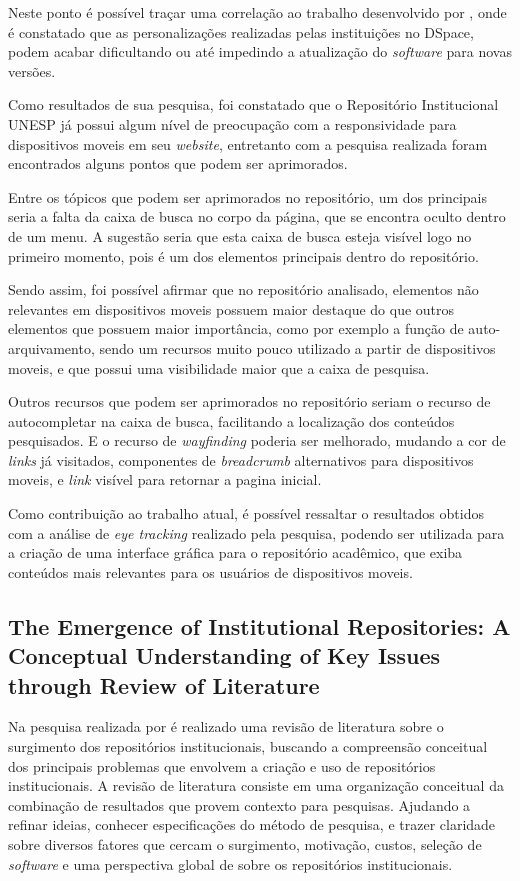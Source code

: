 Neste ponto é possível traçar uma correlação ao trabalho desenvolvido por
\cite{2019:RodrigoMoreira}, onde é constatado que as
personalizações realizadas pelas instituições no DSpace,
podem acabar dificultando ou até impedindo a atualização do
\emph{software} para novas versões.

Como resultados de sua pesquisa, foi constatado que o Repositório
Institucional UNESP já possui algum nível de preocupação com a
responsividade para dispositivos moveis em seu \emph{website},
entretanto com a pesquisa realizada foram encontrados alguns
pontos que podem ser aprimorados.

Entre os tópicos que podem ser aprimorados no repositório,
um dos principais seria a falta da caixa de busca no corpo
da página, que se encontra oculto dentro de um menu. A sugestão
seria que esta caixa de busca esteja visível logo no primeiro
momento, pois é um dos elementos principais dentro do repositório.

Sendo assim, foi possível afirmar que no repositório analisado,
elementos não relevantes em dispositivos moveis possuem maior destaque
do que outros elementos que possuem maior importância,
como por exemplo a função de auto-arquivamento,
sendo um recursos muito pouco utilizado a partir de dispositivos moveis,
e que possui uma visibilidade maior que a caixa de pesquisa.

Outros recursos que podem ser aprimorados no repositório seriam
o recurso de autocompletar na caixa de busca, facilitando a localização
dos conteúdos pesquisados. E o recurso de \emph{wayfinding} poderia ser
melhorado, mudando a cor de \emph{links} já visitados, componentes
de \emph{breadcrumb} alternativos para dispositivos moveis, e
\emph{link} visível para retornar a pagina inicial.

Como contribuição ao trabalho atual, é possível ressaltar o resultados
obtidos com a análise de \emph{eye tracking} realizado pela pesquisa,
podendo ser utilizada para a criação de uma interface gráfica para
o repositório acadêmico, que exiba conteúdos mais relevantes para
os usuários de dispositivos moveis.

\subsection{The Emergence of Institutional Repositories: A Conceptual Understanding of Key Issues through Review of Literature}

Na pesquisa realizada por \cite{2018:Saini} é realizado uma revisão de
literatura sobre o surgimento dos repositórios institucionais,
buscando a compreensão conceitual dos principais problemas que envolvem
a criação e uso de repositórios institucionais. A revisão de literatura
consiste em uma organização conceitual da combinação de resultados que provem
contexto para pesquisas. Ajudando a refinar ideias, conhecer especificações do
método de pesquisa, e trazer claridade sobre diversos fatores que cercam o
surgimento, motivação, custos, seleção de \emph{software} e uma perspectiva global
de sobre os repositórios institucionais.


